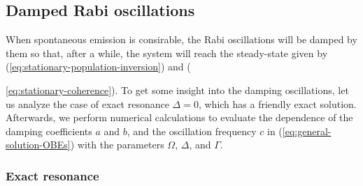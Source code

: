 \subsection{Damped Rabi oscillations}
\label{sec:damped-Rabi-oscillations}

When spontaneous emission is consirable, the Rabi oscillations will be damped by them so that, after a while, the system will reach the steady-state given by (\ref{eq:stationary-population-inversion}) and ({\ref{eq:stationary-coherence}). To get some insight into the damping oscillations, let us analyze the case of exact resonance $ \Delta = 0 $, which has a friendly exact solution. Afterwards, we perform numerical calculations to evaluate the dependence of the damping coefficients $ a $ and $ b $, and the oscillation frequency $ c $ in (\ref{eq:general-solution-OBEs}) with the parameters $ \Omega $, $ \Delta $, and $ \Gamma $.

\subsubsection{Exact resonance}
\label{sec:exact-resonance}

}
